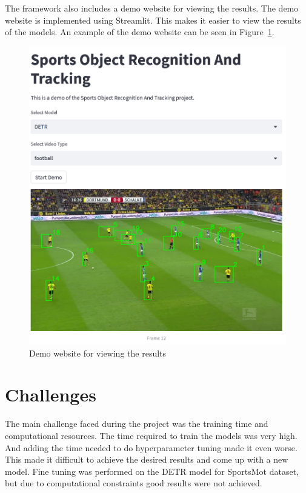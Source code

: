 \documentclass[runningheads]{llncs}
\begin{document}
The framework also includes a demo website for viewing the results.
The demo website is implemented using Streamlit.
This makes it easier to view the results of the models.
An example of the demo website can be seen in Figure~\ref{fig:sport_demo}.

\begin{figure}
    \centering
    \includegraphics[width=\textwidth,height=13cm,keepaspectratio]{images/sport_demo.png}
    \caption{Demo website for viewing the results}
    \label{fig:sport_demo}
\end{figure}


\section{Challenges}

The main challenge faced during the project was the training time and computational resources.
The time required to train the models was very high.
And adding the time needed to do hyperparameter tuning made it even worse.
This made it difficult to achieve the desired results and come up with a new model.
Fine tuning was performed  on the DETR model for SportsMot dataset, but due to computational constraints good results were not achieved.
\end{document}
